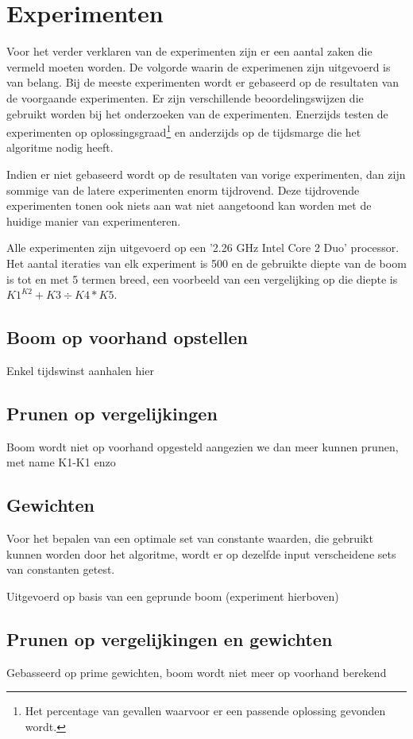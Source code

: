 \documentclass[Main.tex]{subfiles}
\begin{document}
\section{Experimenten}
Voor het verder verklaren van de experimenten zijn er een aantal zaken die vermeld moeten worden. De volgorde waarin de experimenen zijn uitgevoerd is van belang. Bij de meeste experimenten wordt er gebaseerd op de resultaten van de voorgaande experimenten. Er zijn verschillende beoordelingswijzen die gebruikt worden bij het onderzoeken van de experimenten. Enerzijds testen de experimenten op oplossingsgraad\footnote{Het percentage van gevallen waarvoor er een passende oplossing gevonden wordt.} en anderzijds op de tijdsmarge die het algoritme nodig heeft. 
\par
Indien er niet gebaseerd wordt op de resultaten van vorige experimenten, dan zijn sommige van de latere experimenten enorm tijdrovend. Deze tijdrovende experimenten tonen ook niets aan wat niet aangetoond kan worden met de huidige manier van experimenteren.
\par
Alle experimenten zijn uitgevoerd op een '2.26 GHz Intel Core 2 Duo' processor. Het aantal iteraties van elk experiment is 500 en de gebruikte diepte van de boom is tot en met 5 termen breed, een voorbeeld van een vergelijking op die diepte is $K1^{K2}+K3 \div K4*K5$.

\subsection{Boom op voorhand opstellen}

Enkel tijdswinst aanhalen hier %

\subsection{Prunen op vergelijkingen}


Boom wordt niet op voorhand opgesteld aangezien we dan meer kunnen prunen, met name K1-K1 enzo
\subsection{Gewichten}
Voor het bepalen van een optimale set van constante waarden, die gebruikt kunnen worden door het algoritme, wordt er op dezelfde input verscheidene sets van constanten getest. 


Uitgevoerd op basis van een geprunde boom (experiment hierboven)
\subsection{Prunen op vergelijkingen en gewichten}
Gebasseerd op prime gewichten, boom wordt niet meer op voorhand berekend
\end{document}
